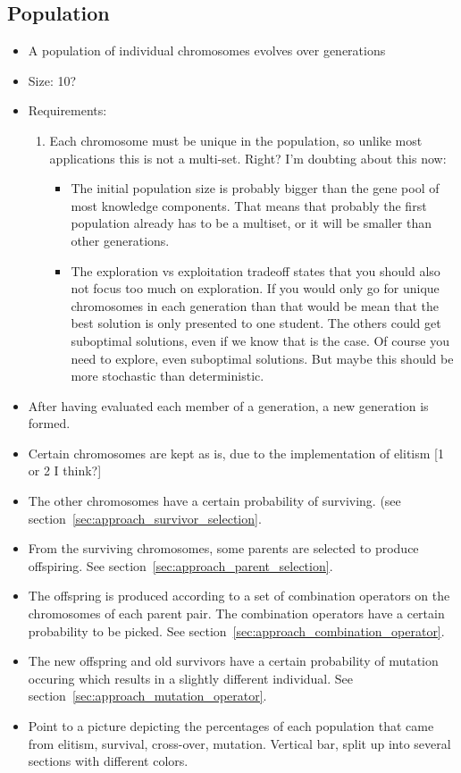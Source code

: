 \subsection{Population}
\begin{itemize}
	\item A population of individual chromosomes evolves over generations
	\item Size: 10?
	\item Requirements:
		\begin{enumerate}
			\item Each chromosome must be unique in the population, so unlike
				most applications this is not a multi-set. Right?
				I'm doubting about this now:
				\begin{itemize}
					\item The initial population size is probably bigger than
						the gene pool of most knowledge components. That means
						that probably the first population already has to be a
						multiset, or it will be smaller than other generations.
					\item The exploration vs exploitation tradeoff states that
						you should also not focus too much on exploration. If
						you would only go for unique chromosomes in each
						generation than that would be mean that the best
						solution is only presented to one student. The others
						could get suboptimal solutions, even if we know that is
						the case. Of course you need to explore, even
						suboptimal solutions. But maybe this should be more
						stochastic than deterministic.
				\end{itemize}
		\end{enumerate}
	\item After having evaluated each member of a generation, a new generation
		is formed.
	\item Certain chromosomes are kept as is, due to the implementation of elitism
		[1 or 2 I think?]
	\item The other chromosomes have a certain probability of surviving. (see
		section~\ref{sec:approach_survivor_selection}.
	\item From the surviving chromosomes, some parents are selected to produce
		offspiring. See section~\ref{sec:approach_parent_selection}.
	\item The offspring is produced according to a set of combination operators
		on the chromosomes of each parent pair. The combination operators have
		a certain probability to be picked. See
		section~\ref{sec:approach_combination_operator}.
	\item The new offspring and old survivors have a certain probability of
		mutation occuring which results in a slightly different individual. See
		section~\ref{sec:approach_mutation_operator}.
	\item Point to a picture depicting the percentages of each population that
		came from elitism, survival, cross-over, mutation. Vertical bar, split
		up into several sections with different colors.
\end{itemize}
